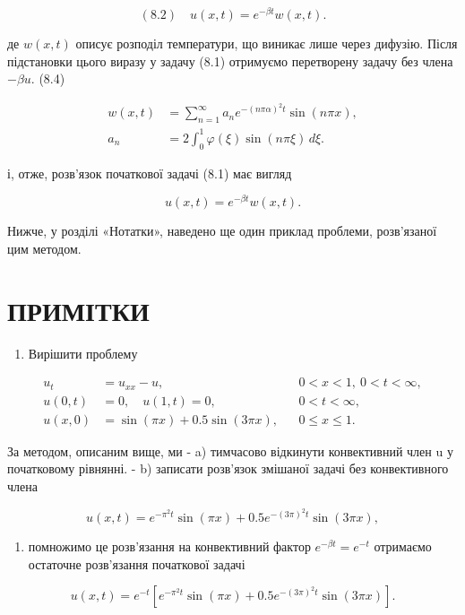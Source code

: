 \[
(8.2)\quad u(x,t)=e^{-\beta t}w(x,t).
\]

де \(w(x,t)\) описує розподіл температури, що виникає лише через дифузію. Після підстановки цього виразу у задачу (8.1) отримуємо перетворену задачу без члена \(-\beta u\). (8.4)

\[
\begin{aligned}
w(x,t)&=\sum_{n=1}^{\infty} a_n e^{-(n\pi\alpha)^2 t}\sin(n\pi x),\\
a_n&=2\int_0^1 \varphi(\xi)\sin(n\pi \xi)\,d\xi.
\end{aligned}
\]

і, отже, розв'язок початкової задачі (8.1) має вигляд

\[
u(x, t) = e^{-\beta t}w(x, t).
\]

Нижче, у розділі «Нотатки», наведено ще один приклад проблеми, розв'язаної цим методом.

\section{ПРИМІТКИ}\label{ux43fux440ux438ux43cux456ux442ux43aux438}

\begin{enumerate}
\def\labelenumi{\arabic{enumi}.}
\tightlist
\item
  Вирішити проблему
\end{enumerate}

\[
\begin{aligned}
u_t &= u_{xx} - u, && 0 < x < 1,\ 0 < t < \infty, \\
u(0,t) &= 0,\quad u(1,t) = 0, && 0 < t < \infty, \\
u(x,0) &= \sin(\pi x) + 0.5\sin(3\pi x), && 0 \leqslant x \leqslant 1.
\end{aligned}
\]

За методом, описаним вище, ми - a) тимчасово відкинути конвективний член u у початковому рівнянні. - b) записати розв'язок змішаної задачі без конвективного члена

\[
u(x, t) = e^{-\pi^2 t} \sin(\pi x) + 0.5e^{-(3\pi)^2 t} \sin(3\pi x),
\]

\begin{enumerate}
\def\labelenumi{\alph{enumi})}
\setcounter{enumi}{2}
\tightlist
\item
  помножимо це розв'язання на конвективний фактор \(e^{-\beta t}=e^{-t}\) отримаємо остаточне розв'язання початкової задачі
\end{enumerate}

\[
u(x, t) = e^{-t} \left[ e^{-\pi^2 t} \sin(\pi x) + 0.5e^{-(3\pi)^2 t} \sin(3\pi x) \right].
\]


